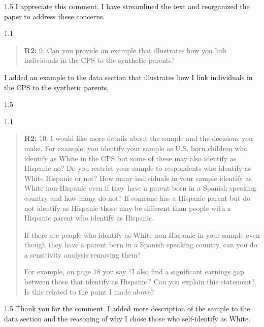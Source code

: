 \documentclass[12pt,english]{article}
\newcommand{\rrquote}{1.1}
\newcommand{\rrxspc}{1.5}
\begin{document}
\begin{refsection}
        \begin{spacing}{\rrxspc}
            I appreciate this comment. I have streamlined the text and reorganized the paper to address these concerns. 
    \end{spacing}

    \begin{spacing}{\rrquote}
        \begin{quotation}
        \textbf{R2: } 9. Can you provide an example that illustrates how you link individuals in the CPS to the synthetic parents?
              
        \end{quotation}
        \end{spacing}
            I added an example to the data section that illustrates how I link individuals in the CPS to the synthetic parents.
        \begin{spacing}{\rrxspc}
            
    \end{spacing}

    \begin{spacing}{\rrquote}
        \begin{quotation}
        \textbf{R2: } 10. I would like more details about the sample and the decisions you make. For example, you identify your sample as U.S. born children who identify as White in the CPS but some of these may also identify as Hispanic no? Do you restrict your sample to respondents who identify as White Hispanic or not? How many individuals in your sample identify as White non-Hispanic even if they have a parent born in a Spanish speaking country and how many do not? If someone has a Hispanic parent but do not identify as Hispanic those may be different than people with a Hispanic parent who identify as Hispanic.
        
        If there are people who identify as White non Hispanic in your sample even though they have a parent born in a Spanish speaking country, can you do a sensitivity analysis removing them?

        For example, on page 18 you say “I also find a significant earnings gap between those that identify as Hispanic.” Can you explain this statement? Is this related to the point I made above?

        \end{quotation}
        \end{spacing}
        
        \begin{spacing}{\rrxspc}
            Thank you for the comment. I added more description of the sample to the data section and the reasoning of why I chose those who self-identify as White. 
    \end{spacing}


\end{refsection}
\end{document}
